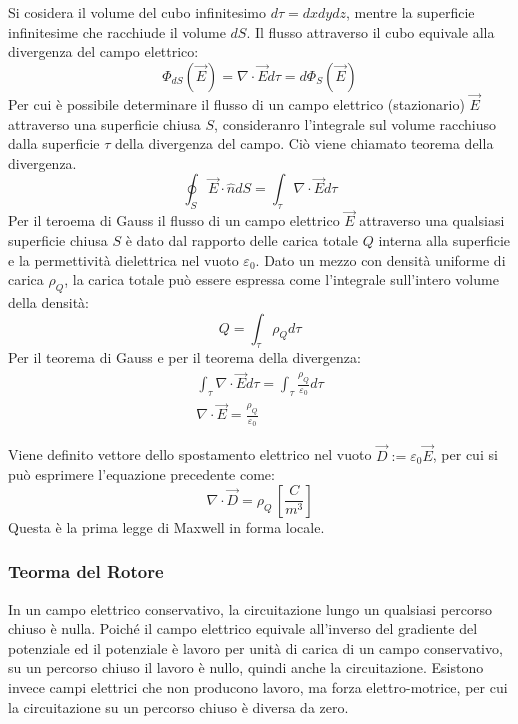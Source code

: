 \documentclass{article}
\numberwithin{equation}{subsection}
\begin{document}
Si cosidera il volume del cubo infinitesimo $d\tau=dxdydz$, mentre la superficie infinitesime che racchiude il volume $dS$. Il flusso attraverso il cubo equivale alla 
divergenza del campo elettrico: 
\begin{equation*}
    \Phi_{dS}(\vec{E})={\nabla}\cdot\vec{E}d\tau=d\Phi_S(\vec{E})
\end{equation*}
Per cui è possibile determinare il flusso di un campo elettrico (stazionario) $\vec{E}$ attraverso una superficie chiusa $S$, consideranro l'integrale sul volume 
racchiuso dalla superficie $\tau$ della divergenza del campo. Ciò viene chiamato teorema della divergenza. 
\begin{equation}
    \displaystyle\oint_S\vec{E}\cdot\hat{n}dS=\int_{\tau}{\nabla}\cdot\vec{E}d\tau
\end{equation} 
Per il teroema di Gauss il flusso di un campo elettrico $\vec{E}$ attraverso una qualsiasi superficie chiusa $S$ è dato dal rapporto delle carica totale $Q$ interna alla superficie 
e la permettività dielettrica nel vuoto $\varepsilon_0$. Dato un mezzo con densità uniforme di carica $\rho_Q$, la carica totale può essere espressa come l'integrale sull'intero 
volume della densità: 
\begin{equation*}
    Q=\displaystyle\int_{\tau}\rho_Qd\tau
\end{equation*}  
Per il teorema di Gauss e per il teorema della divergenza:
\begin{gather*}
    \displaystyle\int_{\tau}{\nabla}\cdot \vec{E}d\tau=\int_{\tau}\frac{\rho_Q}{\varepsilon_0}d\tau\\
    {\nabla}\cdot\vec{E}=\displaystyle\frac{\rho_Q}{\varepsilon_0}
\end{gather*}

Viene definito vettore dello spostamento elettrico nel vuoto $\vec{D}:=\varepsilon_0\vec{E}$, per cui si può esprimere l'equazione precedente come:
\begin{equation}
    {\nabla}\cdot\vec{D}=\rho_Q\,\displaystyle\left[\frac{C}{m^3}\right]
\end{equation}
Questa è la prima legge di Maxwell in forma locale. 

\subsubsection{Teorma del Rotore}

In un campo elettrico conservativo, la circuitazione lungo un qualsiasi percorso chiuso è nulla. Poiché il campo elettrico equivale all'inverso del gradiente del 
potenziale ed il potenziale è lavoro per unità di carica di un campo conservativo, su un percorso chiuso il lavoro è nullo, quindi anche la circuitazione. Esistono invece 
campi elettrici che non producono lavoro, ma forza elettro-motrice, per cui la circuitazione su un percorso chiuso è diversa da zero. 
\end{document}

